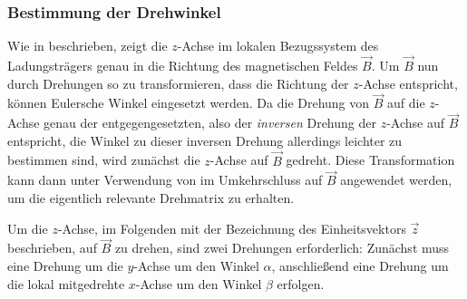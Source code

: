 \subsubsection{Bestimmung der Drehwinkel}
\label{sec:drehwinkel}

Wie in  beschrieben, zeigt die \(z\)-Achse im lokalen Bezugssystem des Ladungstr\"agers genau in die
Richtung des magnetischen Feldes \(\vec{B}\). Um \(\vec{B}\) nun durch Drehungen so zu transformieren, dass die Richtung der
\(z\)-Achse entspricht, k\"onnen Eulersche Winkel eingesetzt werden. Da die Drehung von \(\vec{B}\) auf die \(z\)-Achse genau der
entgegengesetzten, also der \textit{inversen} Drehung der \(z\)-Achse auf \(\vec{B}\) entspricht, die Winkel zu dieser inversen
Drehung allerdings leichter zu bestimmen sind, wird zun\"achst die \(z\)-Achse auf \(\vec{B}\) gedreht. Diese Transformation kann
dann unter Verwendung von  im Umkehrschluss auf \(\vec{B}\) angewendet werden, um die eigentlich relevante
Drehmatrix zu erhalten.

Um die \(z\)-Achse, im Folgenden mit der Bezeichnung des Einheitsvektors \(\vec{z}\) beschrieben, auf \(\vec{B}\) zu drehen, sind
zwei Drehungen erforderlich: Zun\"achst muss eine Drehung um die \(y\)-Achse um den Winkel \(\alpha\), anschlie{\ss}end eine Drehung
um die lokal mitgedrehte \(x\)-Achse um den Winkel \(\beta\) erfolgen.


